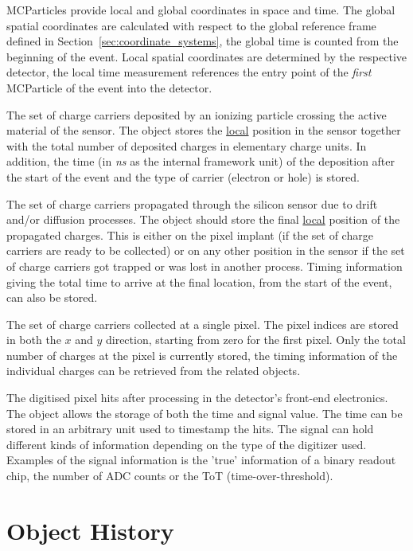 MCParticles provide local and global coordinates in space and time.
The global spatial coordinates are calculated with respect to the global reference frame defined in Section~\ref{sec:coordinate_systems}, the global time is counted from the beginning of the event.
Local spatial coordinates are determined by the respective detector, the local time measurement references the entry point of the \emph{first} MCParticle of the event into the detector.

The set of charge carriers deposited by an ionizing particle crossing the active material of the sensor.
The object stores the \underline{local} position in the sensor together with the total number of deposited charges in elementary charge units.
In addition, the time (in \textit{ns} as the internal framework unit) of the deposition after the start of the event and the type of carrier (electron or hole) is stored.

The set of charge carriers propagated through the silicon sensor due to drift and/or diffusion processes.
The object should store the final \underline{local} position of the propagated charges.
This is either on the pixel implant (if the set of charge carriers are ready to be collected) or on any other position in the sensor if the set of charge carriers got trapped or was lost in another process.
Timing information giving the total time to arrive at the final location, from the start of the event, can also be stored.

The set of charge carriers collected at a single pixel.
The pixel indices are stored in both the $x$ and $y$ direction, starting from zero for the first pixel.
Only the total number of charges at the pixel is currently stored, the timing information of the individual charges can be retrieved from the related  objects.

The digitised pixel hits after processing in the detector's front-end electronics.
The object allows the storage of both the time and signal value.
The time can be stored in an arbitrary unit used to timestamp the hits.
The signal can hold different kinds of information depending on the type of the digitizer used.
Examples of the signal information is the 'true' information of a binary readout chip, the number of ADC counts or the ToT (time-over-threshold).

\section{Object History}
\label{sec:objhistory}

